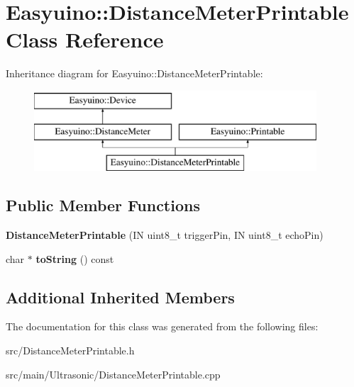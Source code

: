 \hypertarget{class_easyuino_1_1_distance_meter_printable}{}\section{Easyuino\+:\+:Distance\+Meter\+Printable Class Reference}
\label{class_easyuino_1_1_distance_meter_printable}
Inheritance diagram for Easyuino\+:\+:Distance\+Meter\+Printable\+:\begin{figure}[H]
\begin{center}
\leavevmode
\includegraphics[height=3.000000cm]{class_easyuino_1_1_distance_meter_printable}
\end{center}
\end{figure}
\subsection*{Public Member Functions}
\begin{DoxyCompactItemize}
\item 
\mbox{\label{class_easyuino_1_1_distance_meter_printable_a367fe13996801c142f687234390bfc8c}} 
{\bfseries Distance\+Meter\+Printable} (IN uint8\+\_\+t trigger\+Pin, IN uint8\+\_\+t echo\+Pin)
\item 
\mbox{\label{class_easyuino_1_1_distance_meter_printable_a4a7366a8f46038026a0b5023826da83f}} 
char $\ast$ {\bfseries to\+String} () const
\end{DoxyCompactItemize}
\subsection*{Additional Inherited Members}


The documentation for this class was generated from the following files\+:\begin{DoxyCompactItemize}
\item 
src/Distance\+Meter\+Printable.\+h\item 
src/main/\+Ultrasonic/Distance\+Meter\+Printable.\+cpp\end{DoxyCompactItemize}
